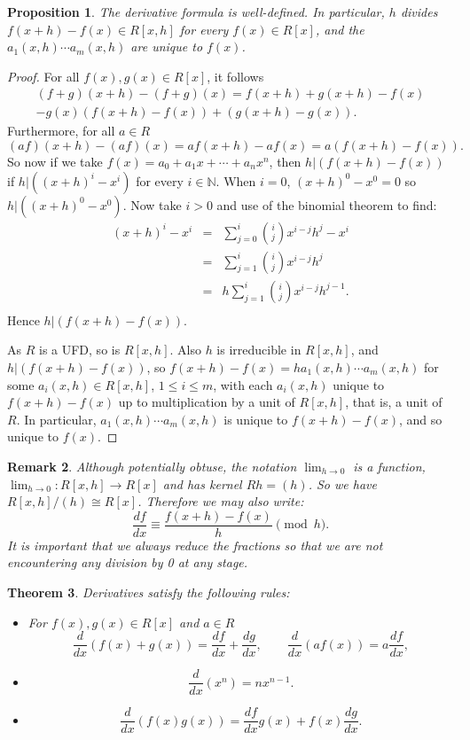 \documentclass[12pt]{article}
\newtheorem{thm}{Theorem}
\newtheorem{prop}[thm]{Proposition}
\newtheorem{remark}[thm]{Remark}
\begin{document}
\begin{prop}
The derivative formula is well-defined.  In particular, 
$h$ divides $f(x+h)-f(x)\in R[x,h]$ for every $f(x)\in R[x]$,
and the $a_1(x,h)\cdots a_m(x,h)$ are unique to $f(x)$.
\end{prop}
\begin{proof}
For all $f(x),g(x)\in R[x]$, it follows
\begin{multline*}
(f+g)(x+h)-(f+g)(x) =f(x+h)+g(x+h)-f(x)\\
    -g(x)(f(x+h)-f(x))+(g(x+h)-g(x)).
\end{multline*}
Furthermore, for all $a\in R$
\[(af)(x+h)-(af)(x)=af(x+h)-af(x)=a(f(x+h)-f(x)).\]
So now if we take $f(x)=a_0+a_1 x+\cdots + a_n x^n$,
then $h|(f(x+h)-f(x))$ if $h|((x+h)^i-x^i)$ for every $i\in \mathbb{N}$.
When $i=0$, $(x+h)^0-x^0=0$ so $h|((x+h)^0-x^0)$.  Now take $i>0$
and use of the binomial theorem to find:
\begin{eqnarray*}
(x+h)^i-x^i & = & \sum_{j=0}^{i} \binom{i}{j} x^{i-j} h^{j}-x^i\\
   & = & \sum_{j=1}^{i} \binom{i}{j} x^{i-j} h^{j}\\
   & = & h\sum_{j=1}^{i} \binom{i}{j} x^{i-j} h^{j-1}.\\
\end{eqnarray*}
Hence $h|(f(x+h)-f(x))$.

As $R$ is a UFD, so is $R[x,h]$.  Also $h$ is irreducible in $R[x,h]$, and
$h|(f(x+h)-f(x))$, so $f(x+h)-f(x)=h a_1(x,h)\cdots a_m(x,h)$ for some
$a_i(x,h)\in R[x,h]$, $1\leq i\leq m$, with each $a_i(x,h)$ unique to $f(x+h)-f(x)$ up to multiplication by a unit of $R[x,h]$, that is, a unit of $R$.  In particular, $a_1(x,h)\cdots a_m(x,h)$ is unique to $f(x+h)-f(x)$, and so unique to $f(x)$.
\end{proof}

\begin{remark}
Although potentially obtuse, the notation $\lim_{h\rightarrow 0}$ is a function,
$\lim_{h\rightarrow 0}:R[x,h]\rightarrow R[x]$ and has kernel $Rh=(h)$.  So
we have $R[x,h]/(h)\cong R[x]$.  Therefore we may also write:
\[\frac{df}{dx} \equiv \frac{f(x+h)-f(x)}{h} \pmod{h}.\]
It is important that we always reduce the fractions so that we are not encountering any division by 0 at any stage.
\end{remark}

\begin{thm}
Derivatives satisfy the following rules:
\begin{itemize}
\item[Linearity]  For $f(x),g(x)\in R[x]$ and $a\in R$
\[\frac{d}{dx}(f(x)+g(x))=\frac{df}{dx}+\frac{dg}{dx},\qquad
\frac{d}{dx}(af(x))=a\frac{df}{dx},\]
\item[Power Rule]
\[\frac{d}{dx}(x^n)=nx^{n-1}.\]
\item[Product Rule]
\[\frac{d}{dx}(f(x)g(x))=\frac{df}{dx}g(x)+f(x)\frac{dg}{dx}.\]
\end{itemize}
\end{thm}
\end{document}
